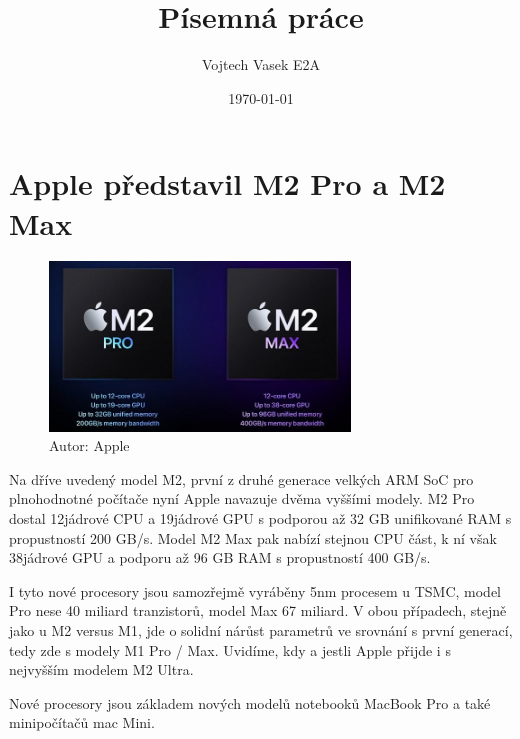 \documentclass[a4paper,12pt]{report}
\title{Písemná práce}
\author{\parbox{\linewidth}{\center%
Vojtech Vasek\endgraf\bigskip
E2A\endgraf}}
\date{\today}
\begin{document}
\maketitle
\tableofcontents
\newpage
\chapter{Apple představil M2 Pro a M2 Max}
\begin{figure}[htp]
\centering
\includegraphics[width=8cm]{IKT_18_1_23@2.jpg}
\caption{Autor: Apple}
\end{figure}
Na dříve uvedený model M2, první z druhé generace velkých ARM SoC pro plnohodnotné počítače nyní Apple navazuje dvěma vyššími modely. M2 Pro dostal 12jádrové CPU a 19jádrové GPU s podporou až 32 GB unifikované RAM s propustností 200 GB/s. Model M2 Max pak nabízí stejnou CPU část, k ní však 38jádrové GPU a podporu až 96 GB RAM s propustností 400 GB/s.

I tyto nové procesory jsou samozřejmě vyráběny 5nm procesem u TSMC, model Pro nese 40 miliard tranzistorů, model Max 67 miliard. V obou případech, stejně jako u M2 versus M1, jde o solidní nárůst parametrů ve srovnání s první generací, tedy zde s modely M1 Pro / Max. Uvidíme, kdy a jestli Apple přijde i s nejvyšším modelem M2 Ultra.

Nové procesory jsou základem nových modelů notebooků MacBook Pro a také minipočítačů mac Mini.
\end{document}
